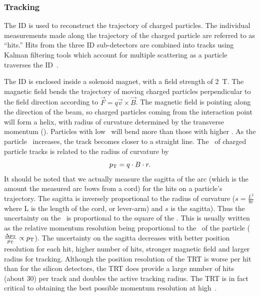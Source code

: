 \subsubsection{Tracking} 
\label{sec:tracking}

The ID is used to reconstruct the trajectory of charged particles.
The individual measurements made along the trajectory of the charged particle
are referred to as ``hits.''
Hits from the three ID sub-detectors are combined into tracks using Kalman
filtering tools which account for multiple scattering as a particle traverses
the ID~\cite{ATLAS-CONF-2014-047,ATLAS-CONF-2012-042}.

The ID is enclosed inside a solenoid magnet, with a field strength of 2~T.
The magnetic field bends the trajectory of moving charged particles
perpendicular to the field direction according to
$\vec{F} = q \vec{v}\times \vec{B}$.
The magnetic field is pointing along the direction of the beam, so charged
particles coming from the interaction point will form a helix, with radius
of curvature determined by the transverse momentum (\pt).
Particles with low \pt\ will bend more than those with higher \pt.
As the particle \pt\ increases, the track becomes closer to a straight line.
The \pt\ of charged particle tracks is related to the radius of curvature by
\begin{equation}
  p_{\mathrm{T}} = q \cdot B \cdot r.
\end{equation}
It should be noted that we actually measure the sagitta of the arc (which is
the amount the measured arc bows from a cord) for the hits on a particle's
trajectory.
The sagitta is inversely proportional to the radius of
curvature ($s=\frac{L^2}{8r}$ where L is the length of the cord, or lever-arm)
and $s$ is the sagitta).
Thus the uncertainty on the \pt\ is proportional to the square of the \pt.
This is usually written as the relative momentum resolution being proportional
to the \pt\ of the particle ($\frac{\Delta p_{\mathrm{T}}}{p_{\mathrm{T}}} \propto p_{\mathrm{T}}$).
The uncertainty on the sagitta decreases with better position resolution for
each hit, higher number of hits, stronger magnetic field and larger radius for
tracking.
Although the position resolution of the TRT is worse per hit than for the
silicon detectors, the TRT does provide a large number of hits (about 30) per
track and doubles the active tracking radius.
The TRT is in fact critical to obtaining the best possible momentum resolution
at high~\pt.

